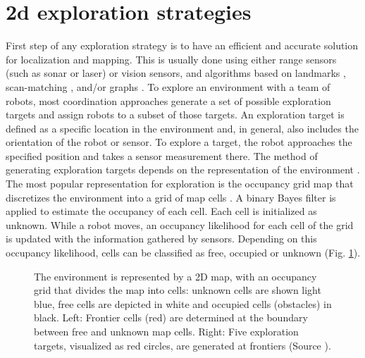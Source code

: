 \section{2d exploration strategies}

First step of any exploration strategy is to have an efficient and accurate solution for localization and mapping. This is usually done using either range sensors (such as sonar or laser) or vision sensors, and algorithms based on landmarks \cite{Dedeoglu2000}, scan-matching \cite{Burgard2000}, and/or graphs \cite{Rekeleitis2000}. 
To explore an environment with a team of robots, most coordination approaches generate a set of possible exploration targets and assign robots to a subset of those targets. An
exploration target is defined as a specific location in the environment and, in general, also includes the orientation of the robot or sensor. To explore a target, the robot approaches the specified position and takes a sensor measurement there. The method of generating exploration targets depends on the representation of the environment \cite{Wurm2012}. 
The most popular representation for exploration is the occupancy grid map that discretizes the environment into a grid of map cells \cite{Moravec}. A binary Bayes filter is applied to estimate the occupancy of each cell. Each cell is initialized as unknown.  While a robot moves, an occupancy likelihood for each cell of the grid is updated with the information gathered by sensors. Depending on this occupancy likelihood, cells can be classified as free, occupied or unknown (Fig. \ref{fig:environment}).

\begin{figure}[t!]
	\centering
	\caption {The environment is represented by a 2D map, with an occupancy grid that divides the map into cells: unknown cells are shown light blue, free cells are depicted in white and occupied cells (obstacles) in black. Left: Frontier cells (red) are determined at the boundary between free and unknown map cells. Right: Five exploration targets, visualized as red circles, are generated at frontiers (Source \cite{Wurm2012}).}
	\label{fig:environment}
\end{figure}

